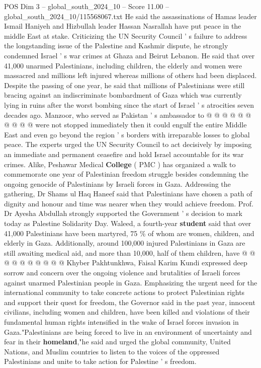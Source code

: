 \begin{textsample}{POS Dim 3 – global\_south\_2024\_10 – Score 11.00 – global\_south\_2024\_10/115568067.txt}
He said the assassinations of Hamas leader Ismail Haniyeh and Hizbullah leader Hassan Nasrallah have put peace in the middle East at stake.
Criticizing the UN Security Council ' s failure to address the longstanding issue of the Palestine and Kashmir dispute, he strongly condemned Israel ' s war crimes at Ghaza and Beirut Lebanon.
He said that over 41,000 unarmed Palestinians, including children, the elderly and women were massacred and millions left injured whereas millions of others had been displaced.
Despite the passing of one year, he said that millions of Palestinians were still bracing against an indiscriminate bombardment of Gaza which was currently lying in ruins after the worst bombing since the start of Israel ' s atrocities seven decades ago.
Manzoor, who served as Pakistan ' s ambassador to @ @ @ @ @ @ @ @ @ @ were not stopped immediately then it could engulf the entire Middle East and even go beyond the region ' s borders with irreparable losses to global peace.
The experts urged the UN Security Council to act decisively by imposing an immediate and permanent ceasefire and hold Israel accountable for its war crimes.
Alike, Peshawar Medical \textbf{College} ( PMC ) has organized a walk to commemorate one year of Palestinian freedom struggle besides condemning the ongoing genocide of Palestinians by Israeli forces in Gaza.
Addressing the gathering, Dr Shams ul Haq Haneef said that Palestinians have chosen a path of dignity and honour and time was nearer when they would achieve freedom.
Prof.
Dr Ayesha Abdullah strongly supported the Government ' s decision to mark today as Palestine Solidarity Day.
Waleed, a fourth-year \textbf{student} said that over 41,000 Palestinians have been martyred, 75 \% of whom are women, children, and elderly in Gaza.
Additionally, around 100,000 injured Palestinians in Gaza are still awaiting medical aid, and more than 10,000, half of them children, have @ @ @ @ @ @ @ @ @ @ Khyber Pakhtunkhwa, Faisal Karim Kundi expressed deep sorrow and concern over the ongoing violence and brutalities of Israeli forces against unarmed Palestinian people in Gaza.
Emphasizing the urgent need for the international community to take concrete actions to protect Palestinian rights and support their quest for freedom, the Governor said in the past year, innocent civilians, including women and children, have been killed and violations of their fundamental human rights intensified in the wake of Israel forces invasion in Gaza."Palestinians are being forced to live in an environment of uncertainty and fear in their \textbf{homeland},"he said and urged the global community, United Nations, and Muslim countries to listen to the voices of the oppressed Palestinians and unite to take action for Palestine ' s freedom.

\end{textsample}
